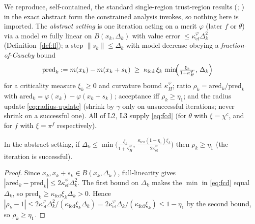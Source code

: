 We reproduce, self-contained, the standard single-region trust-region results
(\citealp[Ch.~6.4]{ConnGouldToint2000}; \citealp[Ch.~10]{CSV2009}) in the exact
abstract form the constrained analysis invokes, so nothing here is imported. The
\emph{abstract setting} is one iteration acting on a merit $\varphi$ (later $f$ or
$\theta$) via a model $m$ fully linear on $B(x_k,\Delta_k)$ with value error
$\le\kappa_{\mathrm{ef}}^\varphi\Delta_k^2$ (Definition~\ref{def:fl}); a step
$\|s_k\|\le\Delta_k$ with model decrease obeying a \emph{fraction-of-Cauchy} bound
\begin{equation}
  \label{eq:fcd}
  \mathrm{pred}_k := m(x_k)-m(x_k+s_k)\;\ge\;\kappa_{\mathrm{fcd}}\,\xi_k\,
    \min\!\Bigl(\tfrac{\xi_k}{1+\kappa_H^\varphi},\,\Delta_k\Bigr)
\end{equation}
for a criticality measure $\xi_k\ge0$ and curvature bound $\kappa_H^\varphi$; ratio
$\rho_k=\mathrm{ared}_k/\mathrm{pred}_k$ with $\mathrm{ared}_k=\varphi(x_k)-\varphi(x_k+s_k)$;
acceptance iff $\rho_k\ge\eta_1$; and the radius update \eqref{eq:radius-update}
(shrink by $\gamma$ only on unsuccessful iterations; never shrink on a successful
one). All of L2, L3 supply \eqref{eq:fcd} (for $\theta$ with $\xi=\chi^c$, and for
$f$ with $\xi=\pi^f$ respectively).

\begin{lemma}
  \label{lem:tr-acc}
  In the abstract setting, if
  $\Delta_k\le\min\!\bigl(\tfrac{\xi_k}{1+\kappa_H^\varphi},\,
     \tfrac{\kappa_{\mathrm{fcd}}(1-\eta_1)\xi_k}{2\kappa_{\mathrm{ef}}^\varphi}\bigr)$
  then $\rho_k\ge\eta_1$ (the iteration is successful).
\end{lemma}
\begin{proof}
  Since $x_k,x_k+s_k\in B(x_k,\Delta_k)$, full-linearity gives
  $|\mathrm{ared}_k-\mathrm{pred}_k|\le 2\kappa_{\mathrm{ef}}^\varphi\Delta_k^2$. The
  first bound on $\Delta_k$ makes the $\min$ in \eqref{eq:fcd} equal $\Delta_k$, so
  $\mathrm{pred}_k\ge\kappa_{\mathrm{fcd}}\xi_k\Delta_k>0$. Hence
  $|\rho_k-1|\le 2\kappa_{\mathrm{ef}}^\varphi\Delta_k^2/(\kappa_{\mathrm{fcd}}\xi_k\Delta_k)
   =2\kappa_{\mathrm{ef}}^\varphi\Delta_k/(\kappa_{\mathrm{fcd}}\xi_k)\le 1-\eta_1$
  by the second bound, so $\rho_k\ge\eta_1$.
\end{proof}

